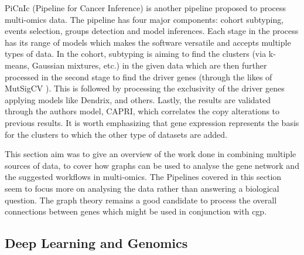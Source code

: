 
PiCnIc (Pipeline for Cancer Inference)\cite{Caravagna2016-vw} is another pipeline proposed to process multi-omics data. The pipeline has four major components: cohort subtyping, events selection, groups detection and model inferences\cite{Caravagna2016-vw}. Each stage in the process has its range of models which makes the software versatile and accepts multiple types of data. In the cohort, subtyping is aiming to find the clusters (via k-means, Gaussian mixtures, etc.) in the given data which are then further processed in the second stage to find the driver genes (through the likes of MutSigCV \cite{Lawrence2013-pl}). This is followed by processing the exclusivity of the driver genes applying models like Dendrix\cite{Vandin2012-cf}, \cite{Zhao2012-wj} and others. Lastly, the results are validated through the authors model, CAPRI, which correlates the copy alterations to previous results. It is worth emphasizing that gene expression represents the basis for the clusters to which the other type of datasets are added.


This section aim was to give an overview of the work done in combining multiple sources of data, to cover how graphs can be used to analyse the gene network and the suggested workflows in multi-omics. The Pipelines covered in this section seem to focus more on analysing the data rather than answering a biological question. The graph theory remains a good candidate to process the overall connections between genes which might be used in conjunction with \acrlong{cgp}.

\subsection{Deep Learning  and Genomics} \label{s:dl_genomics}

\vspace{3mm}
\vspace{3mm}

